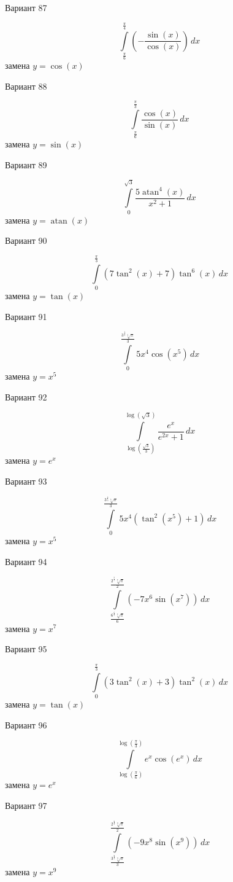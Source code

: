 \documentclass[11pt]{report}
\begin{document}
Вариант 87

$$\int\limits_{\frac{\pi}{6}}^{\frac{\pi}{4}} \left(- \frac{\sin{\left(x \right)}}{\cos{\left(x \right)}}\right)\, dx$$
замена $y = \cos{\left(x \right)}$

Вариант 88

$$\int\limits_{\frac{\pi}{6}}^{\frac{\pi}{3}} \frac{\cos{\left(x \right)}}{\sin{\left(x \right)}}\, dx$$
замена $y = \sin{\left(x \right)}$

Вариант 89

$$\int\limits_{0}^{\sqrt{3}} \frac{5 \operatorname{atan}^{4}{\left(x \right)}}{x^{2} + 1}\, dx$$
замена $y = \operatorname{atan}{\left(x \right)}$

Вариант 90

$$\int\limits_{0}^{\frac{\pi}{3}} \left(7 \tan^{2}{\left(x \right)} + 7\right) \tan^{6}{\left(x \right)}\, dx$$
замена $y = \tan{\left(x \right)}$

Вариант 91

$$\int\limits_{0}^{\frac{3^{\frac{4}{5}} \sqrt[5]{\pi}}{3}} 5 x^{4} \cos{\left(x^{5} \right)}\, dx$$
замена $y = x^{5}$

Вариант 92

$$\int\limits_{\log{\left(\frac{\sqrt{3}}{3} \right)}}^{\log{\left(\sqrt{3} \right)}} \frac{e^{x}}{e^{2 x} + 1}\, dx$$
замена $y = e^{x}$

Вариант 93

$$\int\limits_{0}^{\frac{3^{\frac{4}{5}} \sqrt[5]{\pi}}{3}} 5 x^{4} \left(\tan^{2}{\left(x^{5} \right)} + 1\right)\, dx$$
замена $y = x^{5}$

Вариант 94

$$\int\limits_{\frac{6^{\frac{6}{7}} \sqrt[7]{\pi}}{6}}^{\frac{2^{\frac{5}{7}} \sqrt[7]{\pi}}{2}} \left(- 7 x^{6} \sin{\left(x^{7} \right)}\right)\, dx$$
замена $y = x^{7}$

Вариант 95

$$\int\limits_{0}^{\frac{\pi}{3}} \left(3 \tan^{2}{\left(x \right)} + 3\right) \tan^{2}{\left(x \right)}\, dx$$
замена $y = \tan{\left(x \right)}$

Вариант 96

$$\int\limits_{\log{\left(\frac{\pi}{6} \right)}}^{\log{\left(\frac{\pi}{3} \right)}} e^{x} \cos{\left(e^{x} \right)}\, dx$$
замена $y = e^{x}$

Вариант 97

$$\int\limits_{\frac{3^{\frac{8}{9}} \sqrt[9]{\pi}}{3}}^{\frac{2^{\frac{8}{9}} \sqrt[9]{\pi}}{2}} \left(- 9 x^{8} \sin{\left(x^{9} \right)}\right)\, dx$$
замена $y = x^{9}$
\end{document}
